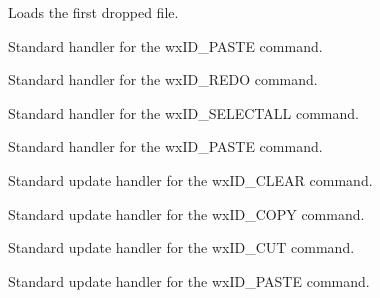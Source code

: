 
Loads the first dropped file.

\label{wxrichtextctrlonpaste}


Standard handler for the wxID\_PASTE command.

\label{wxrichtextctrlonredo}


Standard handler for the wxID\_REDO command.

\label{wxrichtextctrlonselectall}


Standard handler for the wxID\_SELECTALL command.

\label{wxrichtextctrlonundo}


Standard handler for the wxID\_PASTE command.

\label{wxrichtextctrlonupdateclear}


Standard update handler for the wxID\_CLEAR command.

\label{wxrichtextctrlonupdatecopy}


Standard update handler for the wxID\_COPY command.

\label{wxrichtextctrlonupdatecut}


Standard update handler for the wxID\_CUT command.

\label{wxrichtextctrlonupdatepaste}


Standard update handler for the wxID\_PASTE command.


